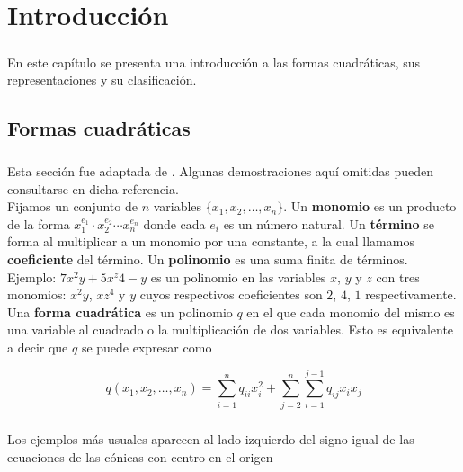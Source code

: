 \chapter{Introducción}

\paragraph*{}
En este capítulo se presenta una introducción a las formas cuadráticas, sus representaciones y su clasificación.

\section{Formas cuadráticas}

\paragraph*{}
Esta sección fue adaptada de \citep{LayDavidC2001Alys}. Algunas demostraciones aquí omitidas pueden consultarse en dicha referencia.\\
Fijamos un conjunto de $n$ variables $\{x_1, x_2, \ldots, x_n\}$. Un \textbf{monomio} es un producto de la forma $x_{1}^{e_{1}} \cdot x_{2}^{e_{2}} \cdots x_{n}^{e_{n}}$ donde cada $e_{i}$ es un número natural. Un \textbf{término} se forma al multiplicar a un monomio por una constante, a la cual llamamos \textbf{coeficiente} del término. Un \textbf{polinomio} es una suma finita de términos.\\
Ejemplo: $7x^{2}y + 5x^z{4} - y$ es un polinomio en las variables $x$, $y$ y $z$ con tres monomios: $x^{2}y$, $xz^{4}$ y $y$ cuyos respectivos coeficientes son $2$, $4$, $1$ respectivamente.\\
Una \textbf{forma cuadrática} es un polinomio $q$ en el que cada monomio del mismo es una variable al cuadrado o la multiplicación de dos variables. Esto es equivalente a decir que $q$ se puede expresar como

\begin{equation*}
q(x_{1}, x_{2}, \ldots, x_{n}) = \sum_{i=1}^{n} q_{ii}x_{i}^{2}+ \sum_{j=2}^{n}\sum_{i=1}^{j-1} q_{ij}x_{i}x_{j}
\end{equation*}

\paragraph*{}
Los ejemplos más usuales aparecen al lado izquierdo del signo igual de las ecuaciones de las cónicas con centro en el origen

